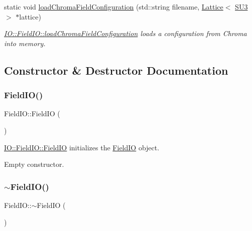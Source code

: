 \begin{DoxyCompactItemize}
static void \mbox{\hyperlink{class_i_o_1_1_field_i_o_af23fb6e02a6bd1cafd5be4acacbf848e}{load\+Chroma\+Field\+Configuration}} (std\+::string filename, \mbox{\hyperlink{class_lattice}{Lattice}}$<$ \mbox{\hyperlink{class_s_u3}{S\+U3}} $>$ $\ast$lattice)
\begin{DoxyCompactList}\small\item\em \mbox{\hyperlink{class_i_o_1_1_field_i_o_af23fb6e02a6bd1cafd5be4acacbf848e}{I\+O\+::\+Field\+I\+O\+::load\+Chroma\+Field\+Configuration}} loads a configuration from Chroma into memory. \end{DoxyCompactList}\end{DoxyCompactItemize}


\subsection{Constructor \& Destructor Documentation}
\mbox{\label{class_i_o_1_1_field_i_o_a8ea52cca792b1a0f7812881b5282edf5}} 
\subsubsection{\texorpdfstring{FieldIO()}{FieldIO()}}
{\footnotesize\ttfamily Field\+I\+O\+::\+Field\+IO (\begin{DoxyParamCaption}{ }\end{DoxyParamCaption})}



\mbox{\hyperlink{class_i_o_1_1_field_i_o_a8ea52cca792b1a0f7812881b5282edf5}{I\+O\+::\+Field\+I\+O\+::\+Field\+IO}} initializes the \mbox{\hyperlink{class_i_o_1_1_field_i_o}{Field\+IO}} object. 

Empty constructor. \mbox{\label{class_i_o_1_1_field_i_o_ae11a6e9e9a57b6f0f56718b82774af19}} 
\subsubsection{\texorpdfstring{$\sim$FieldIO()}{~FieldIO()}}
{\footnotesize\ttfamily Field\+I\+O\+::$\sim$\+Field\+IO (\begin{DoxyParamCaption}{ }\end{DoxyParamCaption})}



